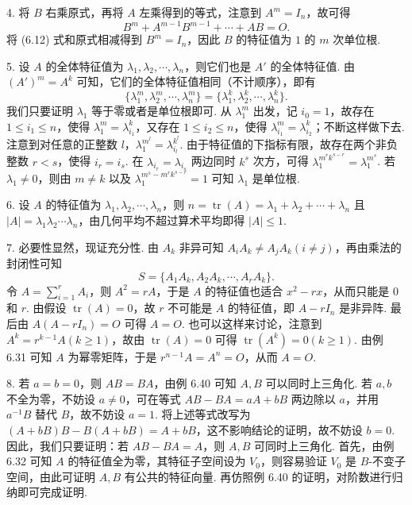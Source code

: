 \documentclass[UTF8,12pt,a4paper,fontset=fandol]{ctexart}
\begin{document}
4. 将 $B$ 右乘原式，再将 $A$ 左乘得到的等式，注意到 $A^m=I_n$，故可得
\begin{equation}
B^m+A^{m-1}B^{m-1}+\cdots+AB=O. \tag{6.12}
\end{equation}
将 (6.12) 式和原式相减得到 $B^m=I_n$，因此 $B$ 的特征值为 $1$ 的 $m$ 次单位根.

5. 设 $A$ 的全体特征值为 $\lambda_1,\lambda_2,\cdots,\lambda_n$，则它们也是 $A'$ 的全体特征值. 由 $(A')^m=A^k$ 可知，它们的全体特征值相同（不计顺序），即有
\[
\{\lambda_1^m,\lambda_2^m,\cdots,\lambda_n^m\}=\{\lambda_1^k,\lambda_2^k,\cdots,\lambda_n^k\}.
\]
我们只要证明 $\lambda_1$ 等于零或者是单位根即可. 从 $\lambda_1^m$ 出发，记 $i_0=1$，故存在 $1\le i_1\le n$，使得 $\lambda_1^m=\lambda_{i_1}^k$，又存在 $1\le i_2\le n$，使得 $\lambda_{i_1}^m=\lambda_{i_2}^k$；不断这样做下去. 注意到对任意的正整数 $l$，$\lambda_1^{m^l}=\lambda_{i_l}^{k^l}$. 由于特征值的下指标有限，故存在两个非负整数 $r<s$，使得 $i_r=i_s$. 在 $\lambda_{i_r}=\lambda_{i_s}$ 两边同时 $k^s$ 次方，可得 $\lambda_1^{m^rk^{s-r}}=\lambda_1^{m^s}$. 若 $\lambda_1\ne 0$，则由 $m\ne k$ 以及 $\lambda_1^{m^s-m^rk^{s-r}}=1$ 可知 $\lambda_1$ 是单位根.

6. 设 $A$ 的特征值为 $\lambda_1,\lambda_2,\cdots,\lambda_n$，则 $n=\operatorname{tr}(A)=\lambda_1+\lambda_2+\cdots+\lambda_n$ 且 $|A|=\lambda_1\lambda_2\cdots\lambda_n$，由几何平均不超过算术平均即得 $|A|\le 1$.

7. 必要性显然，现证充分性. 由 $A_k$ 非异可知 $A_iA_k\ne A_jA_k(i\ne j)$，再由乘法的封闭性可知
\[
S=\{A_1A_k,A_2A_k,\cdots,A_rA_k\}.
\]
令 $A=\sum_{i=1}^rA_i$，则 $A^2=rA$，于是 $A$ 的特征值也适合 $x^2-rx$，从而只能是 $0$ 和 $r$. 由假设 $\operatorname{tr}(A)=0$，故 $r$ 不可能是 $A$ 的特征值，即 $A-rI_n$ 是非异阵. 最后由 $A(A-rI_n)=O$ 可得 $A=O$. 也可以这样来讨论，注意到 $A^k=r^{k-1}A(k\ge 1)$，故由 $\operatorname{tr}(A)=0$ 可得 $\operatorname{tr}(A^k)=0(k\ge 1)$. 由例 6.31 可知 $A$ 为幂零矩阵，于是 $r^{n-1}A=A^n=O$，从而 $A=O$.

8. 若 $a=b=0$，则 $AB=BA$，由例 6.40 可知 $A,B$ 可以同时上三角化. 若 $a,b$ 不全为零，不妨设 $a\ne 0$，可在等式 $AB-BA=aA+bB$ 两边除以 $a$，并用 $a^{-1}B$ 替代 $B$，故不妨设 $a=1$. 将上述等式改写为 $(A+bB)B-B(A+bB)=A+bB$，这不影响结论的证明，故不妨设 $b=0$. 因此，我们只要证明：若 $AB-BA=A$，则 $A,B$ 可同时上三角化. 首先，由例 6.32 可知 $A$ 的特征值全为零，其特征子空间设为 $V_0$，则容易验证 $V_0$ 是 $B$-不变子空间，由此可证明 $A,B$ 有公共的特征向量. 再仿照例 6.40 的证明，对阶数进行归纳即可完成证明.
\end{document}

